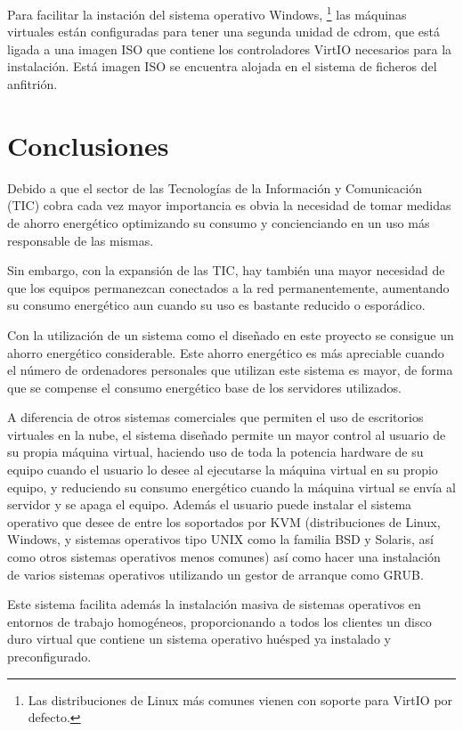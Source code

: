 \documentclass[spanisheDIVcalc,twoside,parskip-,pointlessnumbers,final]{scrbook}
\newcommand{\clearemptydoublepage}{\newpage{\pagestyle{empty}\cleardoublepage}}
\begin{document}
Para facilitar la instación del sistema operativo Windows,%
\footnote{Las distribuciones de Linux más comunes vienen con soporte para VirtIO
por defecto.%
} las máquinas virtuales están configuradas para tener una segunda
unidad de cdrom, que está ligada a una imagen ISO que contiene los
controladores VirtIO necesarios para la instalación. Está imagen ISO
se encuentra alojada en el sistema de ficheros del anfitrión.

\clearemptydoublepage
\chapter{Conclusiones}

Debido a que el sector de las Tecnologías de la Información y Comunicación
(TIC) cobra cada vez mayor importancia es obvia la necesidad de tomar
medidas de ahorro energético optimizando su consumo y concienciando
en un uso más responsable de las mismas.

Sin embargo, con la expansión de las TIC, hay también una mayor necesidad
de que los equipos permanezcan conectados a la red permanentemente,
aumentando su consumo energético aun cuando su uso es bastante reducido
o esporádico.

Con la utilización de un sistema como el diseñado en este proyecto
se consigue un ahorro energético considerable. Este ahorro energético
es más apreciable cuando el número de ordenadores personales que utilizan
este sistema es mayor, de forma que se compense el consumo energético
base de los servidores utilizados.

A diferencia de otros sistemas comerciales que permiten el uso de
escritorios virtuales en la nube, el sistema diseñado permite un mayor
control al usuario de su propia máquina virtual, haciendo uso de toda
la potencia hardware de su equipo cuando el usuario lo desee al ejecutarse
la máquina virtual en su propio equipo, y reduciendo su consumo energético
cuando la máquina virtual se envía al servidor y se apaga el equipo.
Además el usuario puede instalar el sistema operativo que desee de
entre los soportados por KVM (distribuciones de Linux, Windows, y
sistemas operativos tipo UNIX como la familia BSD y Solaris, así como
otros sistemas operativos menos comunes) así como hacer una
instalación de varios sistemas operativos utilizando un gestor de
arranque como GRUB.

Este sistema facilita además la instalación masiva de sistemas operativos
en entornos de trabajo homogéneos, proporcionando a todos los clientes
un disco duro virtual que contiene un sistema operativo huésped ya
instalado y preconfigurado.
\end{document}
